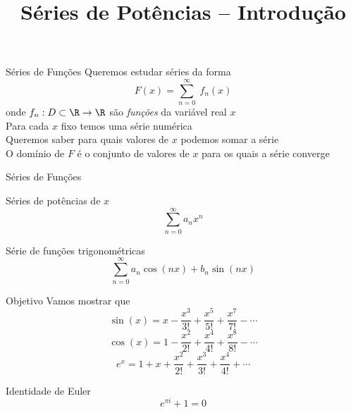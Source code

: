 \documentclass[fleqn,utf8,aspectratio=169,12pt]{beamer}
\title{Séries de Potências -- Introdução}
\begin{document}
\addtitle

\begin{frame}{Séries de Funções}
  Queremos estudar séries da forma
  \[
    F(x) = \sum_{n=0}^\infty\; f_n(x)
  \]
  \pause
  onde $f_n:D \subset \R\to\R$ são \emph{funções} da variável real $x$ \\[5mm]

  \pause
  Para cada $x$ fixo temos uma série numérica \\[5mm]

  \pause
  Queremos saber para quais valores de $x$ podemos somar a série \\[5mm]

  \pause
  O domínio de $F$ é o conjunto de valores de $x$ para os quais a série converge
\end{frame}

\begin{frame}{Séries de Funções}
  \begin{description}[<+->]
    \item[Séries de Potências] Séries de potências de $x$
    \[
      \sum_{n=0}^\infty a_n x^n
    \]

    \item[Séries de Fourier] Série de funções trigonométricas
    \[
      \sum_{n=0}^\infty a_n \cos(nx) + b_n \sin(nx)
    \]
  \end{description}
\end{frame}

\begin{frame}{Objetivo}
  Vamos mostrar que
  \pause
  \[
    \sin(x) = x - \frac{x^3}{3!} + \frac{x^5}{5!} + \frac{x^7}{7!} - \cdots
  \]
  \pause
  \[
    \cos(x) = 1 - \frac{x^2}{2!} + \frac{x^4}{4!} + \frac{x^8}{8!} - \cdots
  \]
  \pause
  \[
    e^x = 1 + x + \frac{x^2}{2!} + \frac{x^3}{3!} + \frac{x^4}{4!} +  \cdots
  \]
\end{frame}

\begin{frame}{Identidade de Euler}
  \Huge
  \[
    e^{\pi i} + 1 = 0
  \]
\end{frame}

\end{document}
